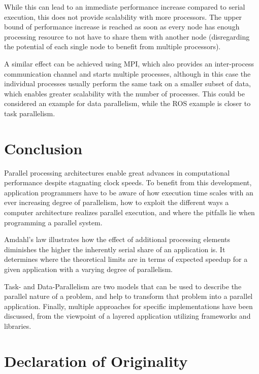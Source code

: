 \documentclass[BCOR20mm,DIV14,10pt,headinclude,footexclude,bibtotoc,liststotoc]{article}
\begin{document}
While this can lead to an immediate performance increase compared to serial
execution, this does not provide scalability with more processors. The upper
bound of performance increase is reached as soon as every node has enough
processing resource to not have to share them with another node (disregarding
the potential of each single node to benefit from multiple processors).

A similar effect can be achieved using MPI, which also provides an inter-process
communication channel and starts multiple processes, although in this case the
individual processes usually perform the same task on a smaller subset of data,
which enables greater scalability with the number of processes. This could be
considered an example for data parallelism, while the ROS example is closer to
task parallelism.

\section{Conclusion}
Parallel processing architectures enable great advances in computational
performance despite stagnating clock speeds. To benefit from this development,
application programmers have to be aware of how execution time scales with an
ever increasing degree of parallelism, how to exploit the different ways a
computer architecture realizes parallel execution, and where the pitfalls lie
when programming a parallel system.

Amdahl's law illustrates how the effect of additional processing elements
diminishes the higher the inherently serial share of an application is. It
determines where the theoretical limits are in terms of expected speedup for a
given application with a varying degree of parallelism.

Task- and Data-Parallelism are two models that can be used to describe the
parallel nature of a problem, and help to transform that problem into a parallel
application. Finally, multiple approaches for specific implementations have been
discussed, from the viewpoint of a layered application utilizing frameworks and
libraries.

\newpage




\cleardoublepage
\section*{Declaration of Originality}
\end{document}
